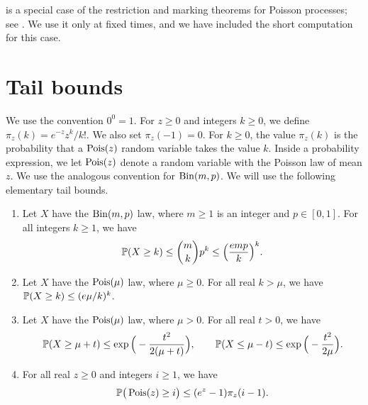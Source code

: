  is a special case of the restriction and marking theorems for Poisson processes; see \cite[Theorems~5.2, 5.6, and~5.8, Corollary~5.9]{last2018lectures}. We use it only at fixed times, and we have included the short computation for this case.

\section{Tail bounds}\label{sec:pre-tails}

We use the convention $0^0 = 1$. For $z \ge 0$ and integers $k \ge 0$, we define $\pi_z(k) = e^{-z} z^k/k!$. We also set $\pi_z(-1) = 0$. For $k \ge 0$, the value $\pi_z(k)$ is the probability that a $\operatorname{Pois}(z)$ random variable takes the value $k$. Inside a probability expression, we let $\operatorname{Pois}(z)$ denote a random variable with the Poisson law of mean $z$. We use the analogous convention for $\operatorname{Bin}(m, p)$. We will use the following elementary tail bounds.

\begin{lemma}\label{lem:pre-tails}
\begin{enumerate}[label=(\alph*)]
\item Let $X$ have the $\operatorname{Bin}(m, p)$ law, where $m \ge 1$ is an integer and $p \in [0, 1]$. For all integers $k \ge 1$, we have
\[
\mathbb P(X \ge k) \le \binom{m}{k} p^k \le \Big(\frac{e m p}{k}\Big)^k.
\]
\item Let $X$ have the $\operatorname{Pois}(\mu)$ law, where $\mu \ge 0$. For all real $k > \mu$, we have $\mathbb P(X \ge k) \le (e \mu/k)^k$.
\item Let $X$ have the $\operatorname{Pois}(\mu)$ law, where $\mu > 0$. For all real $t > 0$, we have
\[
\mathbb P(X \ge \mu + t) \le \exp\Big(-\frac{t^2}{2(\mu + t)}\Big), \qquad \mathbb P(X \le \mu - t) \le \exp\Big(-\frac{t^2}{2\mu}\Big).
\]
\item For all real $z \ge 0$ and integers $i \ge 1$, we have
\[
\mathbb P\big(\operatorname{Pois}(z) \ge i\big) \le (e^z - 1) \pi_z(i - 1).
\]
\end{enumerate}
\end{lemma}

